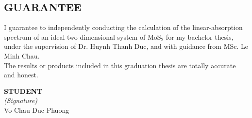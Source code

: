 \documentclass[12pt,english,a4paper]{article}
\begin{document}
%			
%			
%			
%			
	\newpage
	
	\begin{center}
		\section*{GUARANTEE}
	\end{center}
	\quad I guarantee to independently conducting the calculation of the linear-absorption spectrum of an ideal two-dimensional system of $\mathrm{MoS}_2$ for my bachelor thesis, under  the supervision of Dr. Huynh Thanh Duc, and with guidance from MSc. Le Minh Chau.\\\null
	\quad The results or products included in this graduation thesis are totally accurate and honest.\\[2cm]
\parbox{0.75in}{\centering \textbf{}} \hfill \parbox{4in}{\centering \textbf{STUDENT}\\
\textit{(Signature)}\\[2cm] Vo Chau Duc Phuong}
\end{document}
